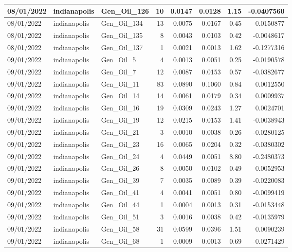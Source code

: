 \documentclass[
  letterpaper,
  DIV=11,
  numbers=noendperiod]{scrartcl}
\begin{document}
\begin{tabular}{l|l|l|r|r|r|r|r}
\hline
08/01/2022 & indianapolis & Gen\_Oil\_126 & 10 & 0.0147 & 0.0128 & 1.15 & -0.0407560\\
\hline
08/01/2022 & indianapolis & Gen\_Oil\_134 & 13 & 0.0075 & 0.0167 & 0.45 & 0.0150877\\
\hline
08/01/2022 & indianapolis & Gen\_Oil\_135 & 8 & 0.0043 & 0.0103 & 0.42 & -0.0048617\\
\hline
08/01/2022 & indianapolis & Gen\_Oil\_137 & 1 & 0.0021 & 0.0013 & 1.62 & -0.1277316\\
\hline
09/01/2022 & indianapolis & Gen\_Oil\_5 & 4 & 0.0013 & 0.0051 & 0.25 & -0.0190578\\
\hline
09/01/2022 & indianapolis & Gen\_Oil\_7 & 12 & 0.0087 & 0.0153 & 0.57 & -0.0382677\\
\hline
09/01/2022 & indianapolis & Gen\_Oil\_11 & 83 & 0.0890 & 0.1060 & 0.84 & 0.0012550\\
\hline
09/01/2022 & indianapolis & Gen\_Oil\_14 & 14 & 0.0061 & 0.0179 & 0.34 & 0.0009937\\
\hline
09/01/2022 & indianapolis & Gen\_Oil\_16 & 19 & 0.0309 & 0.0243 & 1.27 & 0.0024701\\
\hline
09/01/2022 & indianapolis & Gen\_Oil\_19 & 12 & 0.0215 & 0.0153 & 1.41 & -0.0038943\\
\hline
09/01/2022 & indianapolis & Gen\_Oil\_21 & 3 & 0.0010 & 0.0038 & 0.26 & -0.0280125\\
\hline
09/01/2022 & indianapolis & Gen\_Oil\_23 & 16 & 0.0065 & 0.0204 & 0.32 & -0.0380302\\
\hline
09/01/2022 & indianapolis & Gen\_Oil\_24 & 4 & 0.0449 & 0.0051 & 8.80 & -0.2480373\\
\hline
09/01/2022 & indianapolis & Gen\_Oil\_26 & 8 & 0.0050 & 0.0102 & 0.49 & 0.0052953\\
\hline
09/01/2022 & indianapolis & Gen\_Oil\_39 & 7 & 0.0035 & 0.0089 & 0.39 & -0.0220083\\
\hline
09/01/2022 & indianapolis & Gen\_Oil\_41 & 4 & 0.0041 & 0.0051 & 0.80 & -0.0099419\\
\hline
09/01/2022 & indianapolis & Gen\_Oil\_44 & 1 & 0.0004 & 0.0013 & 0.31 & -0.0153448\\
\hline
09/01/2022 & indianapolis & Gen\_Oil\_51 & 3 & 0.0016 & 0.0038 & 0.42 & -0.0135979\\
\hline
09/01/2022 & indianapolis & Gen\_Oil\_58 & 31 & 0.0599 & 0.0396 & 1.51 & 0.0090239\\
\hline
09/01/2022 & indianapolis & Gen\_Oil\_68 & 1 & 0.0009 & 0.0013 & 0.69 & -0.0271429\\

\end{tabular}
\end{document}
